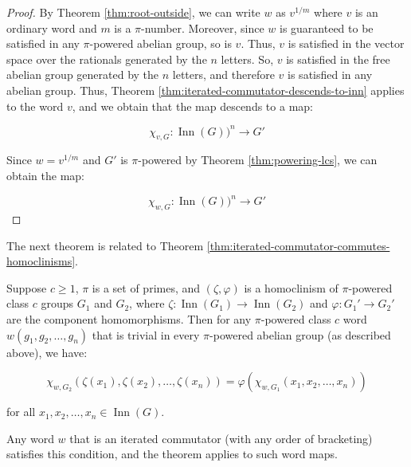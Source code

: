 \documentclass{ucetd}
\begin{document}
\begin{proof}
  By Theorem \ref{thm:root-outside}, we can write $w$ as $v^{1/m}$
  where $v$ is an ordinary word and $m$ is a $\pi$-number. Moreover,
  since $w$ is guaranteed to be satisfied in any $\pi$-powered abelian
  group, so is $v$. Thus, $v$ is satisfied in the vector space over
  the rationals generated by the $n$ letters. So, $v$ is satisfied in
  the free abelian group generated by the $n$ letters, and therefore
  $v$ is satisfied in any abelian group. Thus, Theorem
  \ref{thm:iterated-commutator-descends-to-inn} applies to the word
  $v$, and we obtain that the map descends to a map:

  $$\chi_{v,G}: \operatorname{Inn}(G))^n \to G'$$

  Since $w = v^{1/m}$ and $G'$ is $\pi$-powered by Theorem
  \ref{thm:powering-lcs}, we can obtain the map:

  $$\chi_{w,G}: \operatorname{Inn}(G))^n \to G'$$
\end{proof}

The next theorem is related to Theorem \ref{thm:iterated-commutator-commutes-homoclinisms}.

\begin{theorem}\label{thm:iterated-commutator-commutes-homoclinisms-pi-powered}
  Suppose $c \ge 1$, $\pi$ is a set of primes, and $(\zeta,\varphi)$
  is a homoclinism of $\pi$-powered class $c$ groups $G_1$ and $G_2$,
  where $\zeta:\operatorname{Inn}(G_1) \to \operatorname{Inn}(G_2)$
  and $\varphi:G_1' \to G_2'$ are the component homomorphisms. Then
  for any $\pi$-powered class $c$ word $w(g_1,g_2,\dots,g_n)$ that is
  trivial in every $\pi$-powered abelian group (as described above),
  we have:

  $$\chi_{w,G_2}(\zeta(x_1),\zeta(x_2),\dots,\zeta(x_n)) = \varphi(\chi_{w,G_1}(x_1,x_2,\dots,x_n))$$

  for all $x_1,x_2,\dots,x_n \in \operatorname{Inn}(G)$.

  Any word $w$ that is an iterated commutator (with any order of
  bracketing) satisfies this condition, and the theorem applies to
  such word maps.
\end{theorem}
\end{document}
